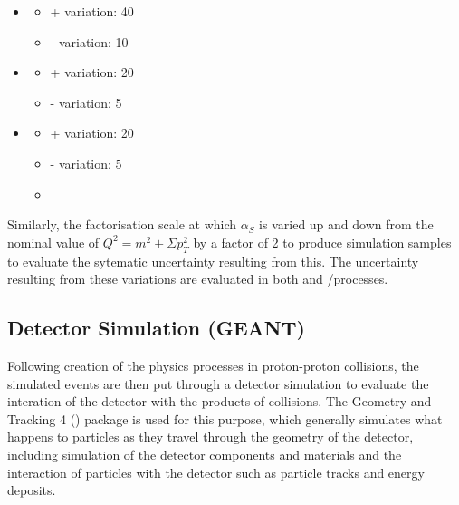 \begin{itemize}
  \item \ttbar
  \begin{itemize}
    \item + variation: 40\GeV
    \item - variation: 10\GeV
  \end{itemize}
  
  \item \WpJets
  \begin{itemize}
    \item + variation: 20\GeV
    \item - variation: 5\GeV
  \end{itemize}

  \item \ZpJets
  \begin{itemize}
    \item + variation: 20\GeV
    \item - variation: 5\GeV
    \item \end{itemize}
\end{itemize}

Similarly, the factorisation scale at which $\alpha_{S}$ is varied up and down from the nominal value of
$Q^{2} = m^{2} + \Sigma p_{T}^{2}$ by a factor of 2 to produce simulation samples to evaluate the sytematic
uncertainty resulting from this. The uncertainty resulting from these variations are evaluated in both \ttbar
and \W/\ZpJets processes.

\subsection{Detector Simulation (GEANT)}
\label{ss:detector_simulation}
Following creation of the physics processes in proton-proton collisions, the simulated events are then put
through a detector simulation to evaluate the interation of the detector with the products of collisions. The
Geometry and Tracking 4 (\GEANTfour) package is used for this purpose, which generally simulates what happens
to particles as they travel through the geometry of the detector, including simulation of the detector
components and materials and the interaction of particles with the detector such as particle tracks and energy
deposits.